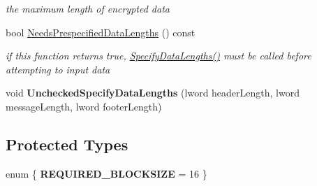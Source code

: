 \begin{DoxyCompactItemize}
\begin{DoxyCompactList}\small\item\em the maximum length of encrypted data \item\end{DoxyCompactList}\item 
bool \hyperlink{class_c_c_m___base_a7738d2cc1969a72ee2693e49ace9565b}{NeedsPrespecifiedDataLengths} () const 
\begin{DoxyCompactList}\small\item\em if this function returns true, \hyperlink{class_authenticated_symmetric_cipher_a7684bed45aa7e8b19de43fcb25b68c57}{SpecifyDataLengths()} must be called before attempting to input data \item\end{DoxyCompactList}\item 
\hypertarget{class_c_c_m___base_a7f645179a9b1d200c9886e249275394e}{
void {\bfseries UncheckedSpecifyDataLengths} (lword headerLength, lword messageLength, lword footerLength)}
\label{class_c_c_m___base_a7f645179a9b1d200c9886e249275394e}

\end{DoxyCompactItemize}
\subsection*{Protected Types}
\begin{DoxyCompactItemize}
\item 
enum \{ {\bfseries REQUIRED\_\-BLOCKSIZE} =  16
 \}
\end{DoxyCompactItemize}
